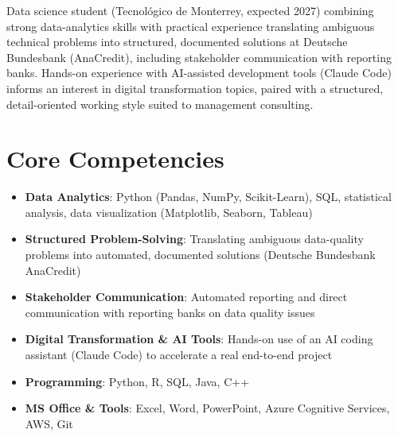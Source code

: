 \documentclass[11pt,a4paper,sans]{moderncv}
\begin{document}
\makecvtitle


\vspace{6pt}
\small{Data science student (Tecnológico de Monterrey, expected 2027) combining strong data-analytics skills with practical experience translating ambiguous technical problems into structured, documented solutions at Deutsche Bundesbank (AnaCredit), including stakeholder communication with reporting banks. Hands-on experience with AI-assisted development tools (Claude Code) informs an interest in digital transformation topics, paired with a structured, detail-oriented working style suited to management consulting.}


\section{Core Competencies}
\vspace{1pt}
\begin{itemize}

\item \textbf{Data Analytics}: Python (Pandas, NumPy, Scikit-Learn), SQL, statistical analysis, data visualization (Matplotlib, Seaborn, Tableau)

\item \textbf{Structured Problem-Solving}: Translating ambiguous data-quality problems into automated, documented solutions (Deutsche Bundesbank AnaCredit)

\item \textbf{Stakeholder Communication}: Automated reporting and direct communication with reporting banks on data quality issues

\item \textbf{Digital Transformation \& AI Tools}: Hands-on use of an AI coding assistant (Claude Code) to accelerate a real end-to-end project

\item \textbf{Programming}: Python, R, SQL, Java, C++

\item \textbf{MS Office \& Tools}: Excel, Word, PowerPoint, Azure Cognitive Services, AWS, Git

\end{itemize}
\end{document}
